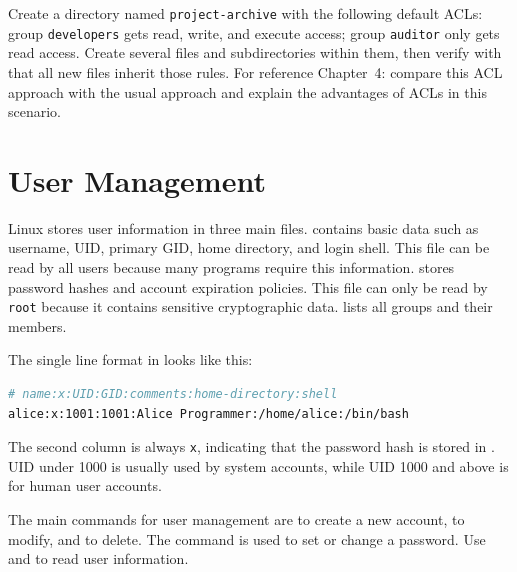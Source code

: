 \begin{challengebox}
Create a directory named \texttt{project-archive} with the following default ACLs: group \texttt{developers} gets read, write, and execute access; group \texttt{auditor} only gets read access. Create several files and subdirectories within them, then verify with  that all new files inherit those rules. For reference Chapter~4: compare this ACL approach with the usual  approach and explain the advantages of ACLs in this scenario.
\end{challengebox}

\section{User Management}
\label{sec:user-management}

Linux stores user information in three main files.  contains basic data such as username, UID, primary GID, home directory, and login shell. This file can be read by all users because many programs require this information.  stores password hashes and account expiration policies. This file can only be read by \texttt{root} because it contains sensitive cryptographic data.  lists all groups and their members.

The single line format in  looks like this:

\begin{lstlisting}[language=bash, caption={File format /etc/passwd}]
# name:x:UID:GID:comments:home-directory:shell
alice:x:1001:1001:Alice Programmer:/home/alice:/bin/bash
\end{lstlisting}

The second column is always \texttt{x}, indicating that the password hash is stored in . UID under 1000 is usually used by system accounts, while UID 1000 and above is for human user accounts.

The main commands for user management are  to create a new account,  to modify, and  to delete. The  command is used to set or change a password. Use  and  to read user information.

